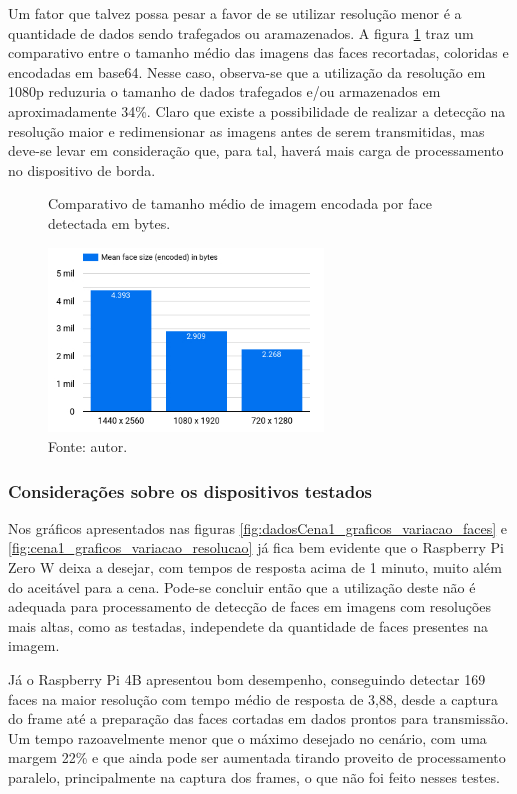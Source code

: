 Um fator que talvez possa pesar a favor de se utilizar resolução menor é a quantidade de dados sendo trafegados ou aramazenados. A figura \ref{fig:cena1_comparativo_tamanho_faces} traz um comparativo entre o tamanho médio das imagens das faces recortadas, coloridas e encodadas em base64. Nesse caso, observa-se que a utilização da resolução em 1080p reduzuria o tamanho de dados trafegados e/ou armazenados em aproximadamente 34\%. Claro que existe a possibilidade de realizar a detecção na resolução maior e redimensionar as imagens antes de serem transmitidas, mas deve-se levar em consideração que, para tal, haverá mais carga de processamento no dispositivo de borda.

\begin{figure}[h]
    \centering
    \caption[Comparativo de tamanho médio de imagem encodada por face detectada em bytes.]{Comparativo de tamanho médio de imagem encodada por face detectada em bytes.}
    \includegraphics[width=0.65\textwidth]{Cap4_Experimentos_Realizados/Figures/cena1_graficos_tamanho_medio_imagem_face.jpg}
    \caption*{Fonte: autor.}
    \label{fig:cena1_comparativo_tamanho_faces}
\end{figure}

\subsubsection{Considerações sobre os dispositivos testados}
Nos gráficos apresentados nas figuras \ref{fig:dadosCena1_graficos_variacao_faces} e \ref{fig:cena1_graficos_variacao_resolucao} já fica bem evidente que o Raspberry Pi Zero W deixa a desejar, com tempos de resposta acima de 1 minuto, muito além do aceitável para a cena. Pode-se concluir então que a utilização deste não é adequada para processamento de detecção de faces em imagens com resoluções mais altas, como as testadas, independete da quantidade de faces presentes na imagem.

Já o Raspberry Pi 4B apresentou bom desempenho, conseguindo detectar 169 faces na maior resolução com tempo médio de resposta de 3,88, desde a captura do frame até a preparação das faces cortadas em dados prontos para transmissão. Um tempo razoavelmente menor que o máximo desejado no cenário, com uma margem 22\% e que ainda pode ser aumentada tirando proveito de processamento paralelo, principalmente na captura dos frames, o que não foi feito nesses testes.

